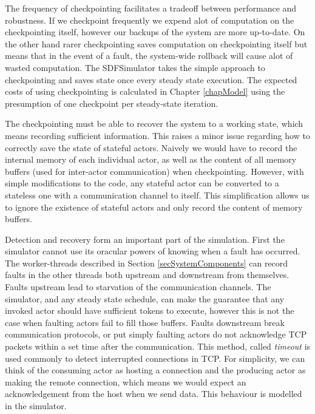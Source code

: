 The frequency of checkpointing facilitates a tradeoff between performance and robustness.
If we checkpoint frequently we expend alot of computation on the checkpointing itself, however our backups of the system are more up-to-date.
On the other hand rarer checkpointing saves computation on checkpointing itself but means that in the event of a fault, the system-wide rollback will cause alot of wasted computation.
The SDFSimulator takes the simple approach to checkpointing and saves state once every steady state execution.
The expected costs of using checkpointing is calculated in Chapter \ref{chapModel} using the presumption of one checkpoint per steady-state iteration.

The checkpointing must be able to recover the system to a working state, which means recording sufficient information.
This raises a minor issue regarding how to correctly save the state of stateful actors.
Naively we would have to record the internal memory of each individual actor, as well as the content of all memory buffers (used for inter-actor communication) when checkpointing.
However, with simple modifications to the code, any stateful actor can be converted to a stateless one with a communication channel to itself.
This simplification allows us to ignore the existence of stateful actors and only record the content of memory buffers.

Detection and recovery form an important part of the simulation.
First the simulator cannot use its oracular powers of knowing when a fault has occurred.
The worker-threads described in Section \ref{secSystemComponents} can record faults in the other threads both upstream and downstream from themselves.
Faults upstream lead to starvation of the communication channels.
The simulator, and any steady state schedule, can make the guarantee that any invoked actor should have sufficient tokens to execute, however this is not the case when faulting actors fail to fill those buffers.
Faults downstream break communication protocols, or put simply faulting actors do not acknowledge TCP packets within a set time after the communication.
This method, called {\em timeout} is used commonly to detect interrupted connections in TCP.
For simplicity, we can think of the consuming actor as hosting a connection and the producing actor as making the remote connection, which means we would expect an acknowledgement from the host when we send data.
This behaviour is modelled in the simulator.

